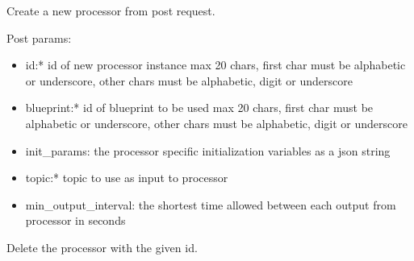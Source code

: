 \documentclass[letterpaper,10pt,english]{sphinxmanual}
\begin{document}

\begin{fulllineitems}
\label{\detokenize{src.processors:src.processors.views.processor_create}}
Create a new processor from post request.

Post params:
\begin{itemize}
\item {} 
id:* id of new processor instance
max 20 chars, first char must be alphabetic or underscore, other chars must be alphabetic, digit or underscore

\item {} 
blueprint:* id of blueprint to be used
max 20 chars, first char must be alphabetic or underscore, other chars must be alphabetic, digit or underscore

\item {} 
init\_params: the processor specific initialization variables as a json string

\item {} 
topic:* topic to use as input to processor

\item {} 
min\_output\_interval: the shortest time allowed between each output from processor in seconds

\end{itemize}

\end{fulllineitems}


\begin{fulllineitems}
\label{\detokenize{src.processors:src.processors.views.processor_delete}}
Delete the processor with the given id.

\end{fulllineitems}

\end{document}
